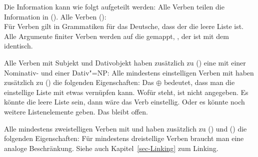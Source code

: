 \noindent
Die Information kann wie folgt aufgeteilt werden: Alle Verben teilen die Information
in ().
\ea
Alle Verben ():\\
\z
Für Verben gilt in Grammatiken für das Deutsche, dass der \sprw die leere Liste ist. Alle Argumente finiter Verben werden auf die
\compsl gemappt, \dash, der \argstw ist mit dem \compsw identisch.

Alle Verben mit Subjekt und Dativobjekt  haben zusätzlich zu () eine \argstl
mit einer Nominativ- und einer Dativ"=NP:
\ea
{}
\z
Alle mindestens einstelligen Verben mit \argone haben zusätzlich
zu () die folgenden Eigenschaften:
\ea
\label{bsp-linking-arg1}%
\z
Das $\oplus$ \etag bedeutet, dass man die einstellige Liste mit etwas vernüpfen kann. Wofür \etag
steht, ist nicht angegeben. Es könnte die leere Liste sein, dann wäre das Verb einstellig. Oder es
könnte noch weitere Listenelemente geben. Das bleibt offen.

Alle mindestens zweistelligen Verben mit \argone und \argtwo haben zusätzlich
zu () und () die folgenden Eigenschaften:
\ea
\label{bsp-linking-arg2}%
\z
Für mindestens dreistellige Verben braucht man eine analoge Beschränkung. 
Siehe auch Kapitel~\ref{sec-Linking} zum Linking. 

